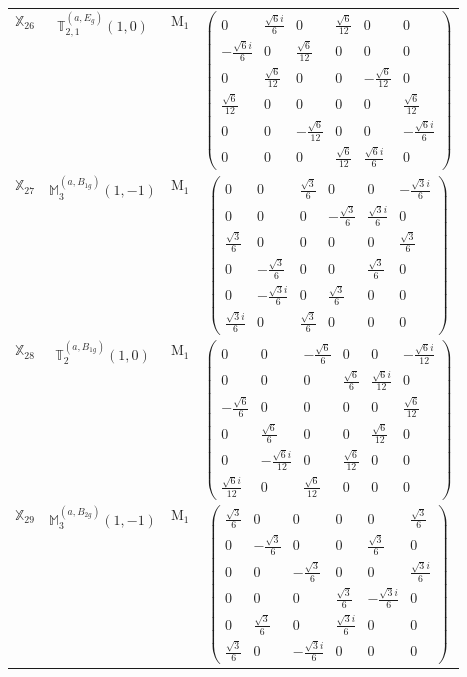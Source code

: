 \documentclass[fleqn,10pt,landscape]{article}
\begin{document}
\begin{itemize}
\begin{center}
\begin{longtable}{c|c|c|c}
$ \mathbb{X}_{26} $ & $\mathbb{T}_{2,1}^{(a,E_{g})}(1,0)$ & M$_{1}$ & $\begin{pmatrix} 0 & \frac{\sqrt{6} i}{6} & 0 & \frac{\sqrt{6}}{12} & 0 & 0 \\ - \frac{\sqrt{6} i}{6} & 0 & \frac{\sqrt{6}}{12} & 0 & 0 & 0 \\ 0 & \frac{\sqrt{6}}{12} & 0 & 0 & - \frac{\sqrt{6}}{12} & 0 \\ \frac{\sqrt{6}}{12} & 0 & 0 & 0 & 0 & \frac{\sqrt{6}}{12} \\ 0 & 0 & - \frac{\sqrt{6}}{12} & 0 & 0 & - \frac{\sqrt{6} i}{6} \\ 0 & 0 & 0 & \frac{\sqrt{6}}{12} & \frac{\sqrt{6} i}{6} & 0 \end{pmatrix}$ \\
$ \mathbb{X}_{27} $ & $\mathbb{M}_{3}^{(a,B_{1g})}(1,-1)$ & M$_{1}$ & $\begin{pmatrix} 0 & 0 & \frac{\sqrt{3}}{6} & 0 & 0 & - \frac{\sqrt{3} i}{6} \\ 0 & 0 & 0 & - \frac{\sqrt{3}}{6} & \frac{\sqrt{3} i}{6} & 0 \\ \frac{\sqrt{3}}{6} & 0 & 0 & 0 & 0 & \frac{\sqrt{3}}{6} \\ 0 & - \frac{\sqrt{3}}{6} & 0 & 0 & \frac{\sqrt{3}}{6} & 0 \\ 0 & - \frac{\sqrt{3} i}{6} & 0 & \frac{\sqrt{3}}{6} & 0 & 0 \\ \frac{\sqrt{3} i}{6} & 0 & \frac{\sqrt{3}}{6} & 0 & 0 & 0 \end{pmatrix}$ \\
$ \mathbb{X}_{28} $ & $\mathbb{T}_{2}^{(a,B_{1g})}(1,0)$ & M$_{1}$ & $\begin{pmatrix} 0 & 0 & - \frac{\sqrt{6}}{6} & 0 & 0 & - \frac{\sqrt{6} i}{12} \\ 0 & 0 & 0 & \frac{\sqrt{6}}{6} & \frac{\sqrt{6} i}{12} & 0 \\ - \frac{\sqrt{6}}{6} & 0 & 0 & 0 & 0 & \frac{\sqrt{6}}{12} \\ 0 & \frac{\sqrt{6}}{6} & 0 & 0 & \frac{\sqrt{6}}{12} & 0 \\ 0 & - \frac{\sqrt{6} i}{12} & 0 & \frac{\sqrt{6}}{12} & 0 & 0 \\ \frac{\sqrt{6} i}{12} & 0 & \frac{\sqrt{6}}{12} & 0 & 0 & 0 \end{pmatrix}$ \\
$ \mathbb{X}_{29} $ & $\mathbb{M}_{3}^{(a,B_{2g})}(1,-1)$ & M$_{1}$ & $\begin{pmatrix} \frac{\sqrt{3}}{6} & 0 & 0 & 0 & 0 & \frac{\sqrt{3}}{6} \\ 0 & - \frac{\sqrt{3}}{6} & 0 & 0 & \frac{\sqrt{3}}{6} & 0 \\ 0 & 0 & - \frac{\sqrt{3}}{6} & 0 & 0 & \frac{\sqrt{3} i}{6} \\ 0 & 0 & 0 & \frac{\sqrt{3}}{6} & - \frac{\sqrt{3} i}{6} & 0 \\ 0 & \frac{\sqrt{3}}{6} & 0 & \frac{\sqrt{3} i}{6} & 0 & 0 \\ \frac{\sqrt{3}}{6} & 0 & - \frac{\sqrt{3} i}{6} & 0 & 0 & 0 \end{pmatrix}$ \\

\end{longtable}
\end{center}
\end{itemize}
\end{document}
